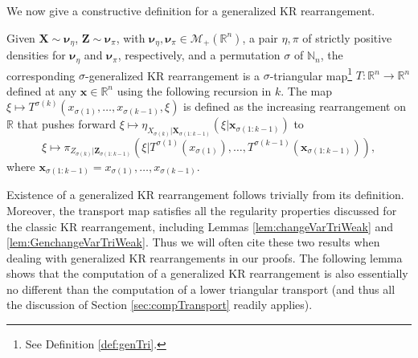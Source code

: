 \documentclass[twoside,11pt]{article}
\newcommand{\borelm}{\mathscr{M}}
\newcommand{\borelmp}{\borelm_+}
\newcommand{\genm}{\boldsymbol{\nu} }   %
\newcommand{\re}{\mathbb{R}}
\newcommand{\ra}{\rightarrow}
\newcommand{\Xb}{\boldsymbol{X}}
\newcommand{\xb}{\boldsymbol{x}}
\newcommand{\Zb}{\boldsymbol{Z}}
\begin{document}
We now give a constructive definition for a generalized 
KR rearrangement.
%
%
%
%
%
%
%
%
%
%
%
%
%
%
%
%
\begin{definition}
\label{def:genKRrearr}
Given 
$\Xb \sim \genm_\eta$, $\Zb \sim \genm_\pi$, with 
$\genm_\eta,\genm_\pi \in \borelmp(\re^n)$, 
a pair $\eta,\pi$ of strictly positive densities for 
$\genm_\eta$ and $\genm_\pi$, respectively, and
a permutation $\sigma$ of
$\mathbb{N}_n$, the corresponding $\sigma$-generalized KR rearrangement is 
%
%
%
%
%
%
%
%
a $\sigma$-triangular map\footnote{
See Definition \ref{def:genTri}.  
} $T:\re^n \ra \re^n$ %
defined at any $\xb \in \re^n$ using the following recursion in $k$.
%
%
%
%
%
%
%
The map 
$\xi \mapsto T^{\sigma(k)}(x_{\sigma(1)},\ldots,x_{\sigma(k-1)} , \xi )$
is
defined as the  increasing rearrangement on $\re$
%
that 
pushes forward $\xi \mapsto \eta_{X_{\sigma(k)} \vert \Xb_{\sigma(1:k-1)} }( \xi \vert 
\xb_{\sigma(1:k-1)})$ to
\begin{equation}
  \xi \mapsto \pi_{Z_{\sigma(k)}
\vert \Zb_{\sigma(1:k-1)}}( \xi \vert T^{\sigma(1)}(x_{\sigma(1)}), \ldots, 
T^{\sigma(k-1)}(\xb_{\sigma(1:k-1)}) ), 
\end{equation}
where
$\xb_{\sigma(1:k-1)} = x_{\sigma(1)},\ldots,x_{\sigma(k-1)}$.
%
%
\end{definition}
%
Existence %
of a generalized KR
rearrangement follows trivially from its definition. %
Moreover, the transport map satisfies all the regularity properties discussed
for the classic  KR rearrangement, including Lemmas 
\ref{lem:changeVarTriWeak} and \ref{lem:GenchangeVarTriWeak}.
Thus we will often cite these two results when dealing with
generalized KR rearrangements in our proofs.
The following lemma shows that the computation of a generalized KR rearrangement is also 
essentially no different than
the computation of a lower triangular transport (and thus all the
discussion of Section \ref{sec:compTransport} readily applies).
\end{document}
